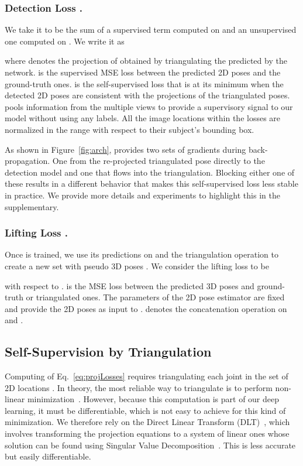 \documentclass[runningheads]{llncs}
\begin{document}
\subsubsection{Detection Loss .}

We take it to be the sum of a supervised term computed on  and an unsupervised one computed on . We write it as

where  denotes the projection of  obtained by triangulating the  predicted by the network.  is the supervised MSE loss between the predicted 2D poses and the ground-truth ones.  is the self-supervised loss that is at its minimum when the detected 2D poses are consistent with the projections of the triangulated poses.  pools information from the multiple views to provide a supervisory signal to our model without using any labels. All the image locations within the losses are normalized in the range  with respect to their subject's bounding box.

As shown in Figure~\ref{fig:arch},  provides two sets of gradients during back-propagation. One from the re-projected triangulated pose directly to the detection model and one that flows into the triangulation. Blocking either one of these results in a different behavior that makes this self-supervised loss less stable in practice. We provide more details and experiments to highlight this in the supplementary.

\subsubsection{Lifting Loss .}

Once  is trained, we use its predictions on  and the triangulation operation  to create a new set with pseudo 3D poses . We consider the lifting loss to be 

with respect to .  is the MSE loss between the predicted 3D poses and ground-truth or triangulated ones. The parameters of the 2D pose estimator  are fixed and provide the 2D poses as input to .  denotes the concatenation operation on  and . 

\subsection{Self-Supervision by Triangulation}
\label{sec:self-supervised}

Computing  of Eq.~\ref{eq:projLosses} requires triangulating each joint  in the set of 2D locations . In theory, the most reliable way to triangulate is to perform non-linear minimization~\cite{Hartley04}. However, because this computation is part of our deep learning, it must be differentiable, which is not easy to achieve for this kind of minimization. We therefore rely on the  Direct Linear Transform (DLT)~\cite{AbdelAziz71}, which involves transforming the projection equations to a system of linear ones whose solution can be found using Singular Value Decomposition~\cite{Golub96}. This is less accurate but easily differentiable. 
\end{document}
